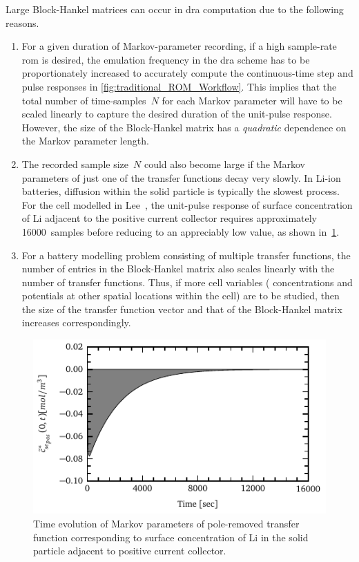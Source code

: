 Large Block-Hankel matrices can occur in \gls{dra} computation due to the
following reasons.
\begin{enumerate}
    \item
        For  a  given   duration  of  Markov-parameter  recording,   if  a  high
        sample-rate   \gls{rom}  is   desired,   the   emulation  frequency   in
        the   \gls{dra}  scheme   has   to  be   proportionately  increased   to
        accurately  compute  the continuous-time  step  and  pulse responses  in
        \cref{fig:traditional_ROM_Workflow}. This implies  that the total number
        of time-samples~$N$  for each  Markov parameter will  have to  be scaled
        linearly to  capture the  desired duration  of the  unit-pulse response.
        However,  the size  of the  Block-Hankel matrix  has a  \emph{quadratic}
        dependence on the Markov parameter length.
    \item
        The  recorded sample  size~$N$ could  also  become large  if the  Markov
        parameters of just  one of the transfer functions decay  very slowly. In
        Li-ion batteries, diffusion  within the solid particle  is typically the
        slowest process.  For the cell  modelled in Lee~\etal{},  the unit-pulse
        response of surface concentration of Li adjacent to the positive current
        collector  requires approximately  16000~samples before  reducing to  an
        appreciably low value, as shown in~\cref{fig:markov_cse_pos}.
    \item
        For  a  battery  modelling   problem  consisting  of  multiple  transfer
        functions,  the  number  of  entries in  the  Block-Hankel  matrix  also
        scales linearly  with the  number of transfer  functions. Thus,  if more
        cell  variables (\eg{}  concentrations and  potentials at  other spatial
        locations  within the  cell) are  to be  studied, then  the size  of the
        transfer function vector  and that of the  Block-Hankel matrix increases
        correspondingly.
\end{enumerate}

\begin{figure}[!htbp]
    \centering
    \includegraphics{markov_decay.pdf}
    \caption[Markov parameters of solid surface concentration at positive
    current collector]{Time evolution of Markov parameters of pole-removed transfer
    function corresponding to surface concentration of Li in the solid particle
adjacent to positive current collector.}
    \label{fig:markov_cse_pos}
\end{figure}

